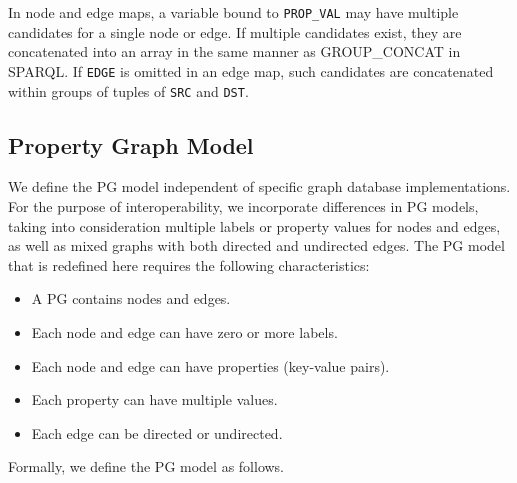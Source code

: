 \documentclass[runningheads]{llncs}
\begin{document}
In node and edge maps, a variable bound to \texttt{PROP\_VAL} may have multiple candidates for a single node or edge. If multiple candidates exist, they are concatenated into an array in the same manner as GROUP\_CONCAT in SPARQL. If \texttt{EDGE} is omitted in an edge map, such candidates are concatenated within groups of tuples of \texttt{SRC} and \texttt{DST}.



\subsection{Property Graph Model}
We define the PG model independent of specific graph database implementations. For the purpose of interoperability, we incorporate differences in PG models, taking into consideration multiple labels or property values for nodes and edges, as well as mixed graphs with both directed and undirected edges. The PG model that is redefined here requires the following characteristics:

\begin{itemize}
    \item A PG contains nodes and edges.
    \item Each node and edge can have zero or more labels.
    \item Each node and edge can have properties (key-value pairs).
    \item Each property can have multiple values.
    \item Each edge can be directed or undirected.
\end{itemize}
Formally, we define the PG model as follows.
\end{document}
